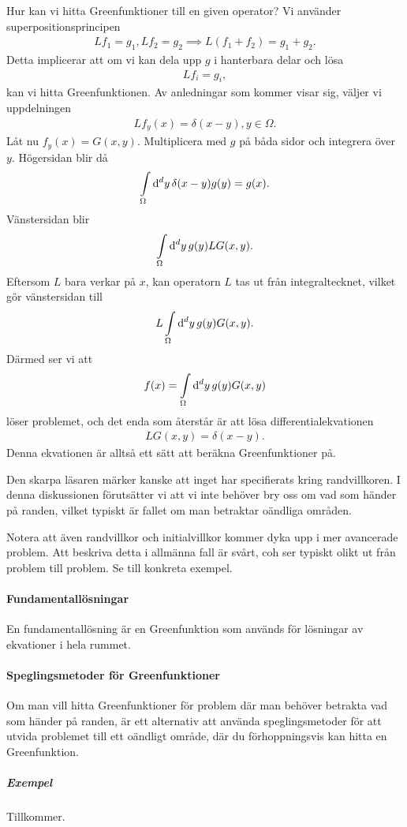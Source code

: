 Hur kan vi hitta Greenfunktioner till en given operator? Vi använder superpositionsprincipen
\begin{align*}
	Lf_{1} = g_{1}, Lf_{2} = g_{2} \implies L(f_{1} + f_{2}) = g_{1} + g_{2}.
\end{align*}
Detta implicerar att om vi kan dela upp $g$ i hanterbara delar och lösa
\begin{align*}
	Lf_{i} = g_{i},
\end{align*}
kan vi hitta Greenfunktionen. Av anledningar som kommer visar sig, väljer vi uppdelningen
\begin{align*}
	Lf_{y}(x) = \delta(x - y), y\in\Omega.
\end{align*}
Låt nu $f_{y}(x) = G(x, y)$. Multiplicera med $g$ på båda sidor och integrera över $y$. Högersidan blir då
\begin{align*}
	\int\limits_{\Omega}\dd[d]{y}\delta(x - y)g(y) = g(x).
\end{align*}
Vänstersidan blir
\begin{align*}
	\int\limits_{\Omega}\dd[d]{y}g(y)LG(x, y).
\end{align*}
Eftersom $L$ bara verkar på $x$, kan operatorn $L$ tas ut från integraltecknet, vilket gör vänstersidan till
\begin{align*}
	L\int\limits_{\Omega}\dd[d]{y}g(y)G(x, y).
\end{align*}
Därmed ser vi att
\begin{align*}
	f(x) = \int\limits_{\Omega}\dd[d]{y}g(y)G(x, y)
\end{align*}
löser problemet, och det enda som återstår är att lösa differentialekvationen
\begin{align*}
	LG(x, y) = \delta(x - y).
\end{align*}
Denna ekvationen är alltså ett sätt att beräkna Greenfunktioner på.

Den skarpa läsaren märker kanske att inget har specifierats kring randvillkoren. I denna diskussionen förutsätter vi att vi inte behöver bry oss om vad som händer på randen, vilket typiskt är fallet om man betraktar oändliga områden.

Notera att även randvillkor och initialvillkor kommer dyka upp i mer avancerade problem. Att beskriva detta i allmänna fall är svårt, coh ser typiskt olikt ut från problem till problem. Se till konkreta exempel.

\paragraph{Fundamentallösningar}
En fundamentallösning är en Greenfunktion som används för lösningar av ekvationer i hela rummet.

\paragraph{Speglingsmetoder för Greenfunktioner}
Om man vill hitta Greenfunktioner för problem där man behöver betrakta vad som händer på randen, är ett alternativ att använda speglingsmetoder för att utvida problemet till ett oändligt område, där du förhoppningsvis kan hitta en Greenfunktion.

\subparagraph{Exempel}
Tillkommer.
